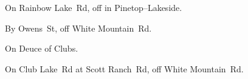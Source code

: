 
\begin{LocationList}

\Location{\RestArea \Rest}
On Rainbow Lake~Rd, off  in Pinetop--Lakeside.

By Owens~St, off  White Mountain~Rd.

On   Deuce of Clubs.

On Club Lake~Rd at Scott Ranch~Rd, off  White Mountain~Rd.

\end{LocationList}

